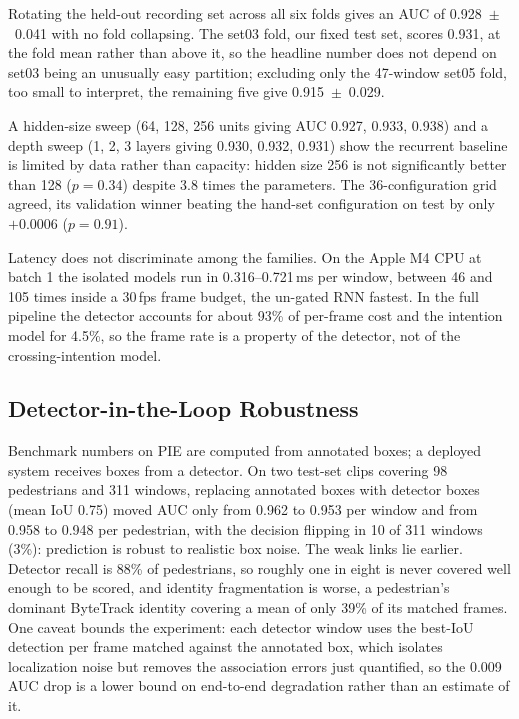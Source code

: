 \documentclass[mti,article,submit,moreauthors]{Definitions/mdpi}
\begin{document}
Rotating the held-out recording set across all six folds gives an AUC of 0.928~$\pm$~0.041 with no fold collapsing. The set03 fold, our fixed test set, scores 0.931, at the fold mean rather than above it, so the headline number does not depend on set03 being an unusually easy partition; excluding only the 47-window set05 fold, too small to interpret, the remaining five give 0.915~$\pm$~0.029.

A hidden-size sweep (64, 128, 256 units giving AUC 0.927, 0.933, 0.938) and a depth sweep (1, 2, 3 layers giving 0.930, 0.932, 0.931) show the recurrent baseline is limited by data rather than capacity: hidden size 256 is not significantly better than 128 ($p = 0.34$) despite 3.8 times the parameters. The 36-configuration grid agreed, its validation winner beating the hand-set configuration on test by only $+0.0006$ ($p = 0.91$).

Latency does not discriminate among the families. On the Apple M4 CPU at batch 1 the isolated models run in 0.316--0.721\,ms per window, between 46 and 105 times inside a 30\,fps frame budget, the un-gated RNN fastest. In the full pipeline the detector accounts for about 93\% of per-frame cost and the intention model for 4.5\%, so the frame rate is a property of the detector, not of the crossing-intention model.

\subsection{Detector-in-the-Loop Robustness}
\label{sec:detector}

Benchmark numbers on PIE are computed from annotated boxes; a deployed system receives boxes from a detector. On two test-set clips covering 98 pedestrians and 311 windows, replacing annotated boxes with detector boxes (mean IoU 0.75) moved AUC only from 0.962 to 0.953 per window and from 0.958 to 0.948 per pedestrian, with the decision flipping in 10 of 311 windows (3\%): prediction is robust to realistic box noise. The weak links lie earlier. Detector recall is 88\% of pedestrians, so roughly one in eight is never covered well enough to be scored, and identity fragmentation is worse, a pedestrian's dominant ByteTrack identity covering a mean of only 39\% of its matched frames. One caveat bounds the experiment: each detector window uses the best-IoU detection per frame matched against the annotated box, which isolates localization noise but removes the association errors just quantified, so the 0.009 AUC drop is a lower bound on end-to-end degradation rather than an estimate of it.
\end{document}
